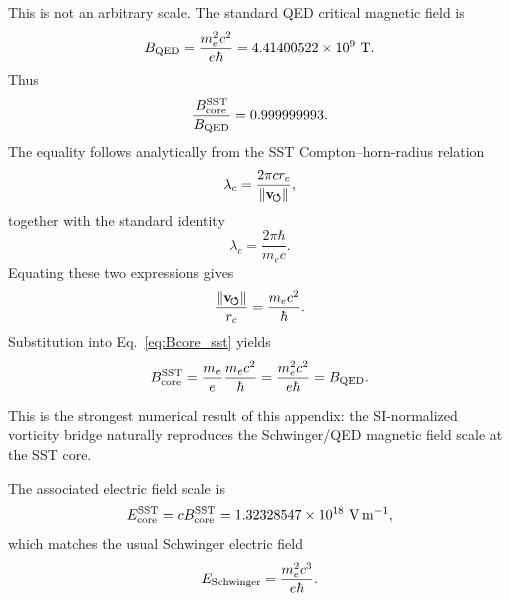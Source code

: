    This is not an arbitrary scale.  The standard QED critical magnetic field
    is
    \begin{equation}
        B_{\rm QED}
        =
        \frac{m_e^2c^2}{e\hbar}
        =
        4.41400522\times10^{9}\ {\rm T}.
        \label{eq:Bqed}
    \end{equation}
    Thus
    \begin{equation}
        \frac{B_{\rm core}^{\rm SST}}{B_{\rm QED}}
        =
        0.999999993.
        \label{eq:Bcore_Bqed_ratio}
    \end{equation}
    The equality follows analytically from the SST Compton--horn-radius relation
    \begin{equation}
        \lambda_c
        =
        \frac{2\pi cr_c}{\lVert\mathbf{v}_{\!\boldsymbol{\circlearrowleft}}\rVert},
        \label{eq:compton_core_relation}
    \end{equation}
    together with the standard identity
    \begin{equation}
        \lambda_c
        =
        \frac{2\pi\hbar}{m_ec}.
    \end{equation}
    Equating these two expressions gives
    \begin{equation}
        \frac{\lVert\mathbf{v}_{\!\boldsymbol{\circlearrowleft}}\rVert}{r_c}
        =
        \frac{m_ec^2}{\hbar}.
        \label{eq:omega_core_compton}
    \end{equation}
    Substitution into Eq.~\eqref{eq:Bcore_sst} yields
    \begin{equation}
        B_{\rm core}^{\rm SST}
        =
        \frac{m_e}{e}
        \frac{m_ec^2}{\hbar}
        =
        \frac{m_e^2c^2}{e\hbar}
        =
        B_{\rm QED}.
        \label{eq:Bcore_equals_Bqed}
    \end{equation}
    
    This is the strongest numerical result of this appendix: the SI-normalized
    vorticity bridge naturally reproduces the Schwinger/QED magnetic field
    scale at the SST core.
    
    The associated electric field scale is
    \begin{equation}
        E_{\rm core}^{\rm SST}
        =
        cB_{\rm core}^{\rm SST}
        =
        1.32328547\times10^{18}\ {\rm V\,m^{-1}},
        \label{eq:Ecore_numeric}
    \end{equation}
    which matches the usual Schwinger electric field
    \begin{equation}
        E_{\rm Schwinger}
        =
        \frac{m_e^2c^3}{e\hbar}.
        \label{eq:Schwinger_field}
    \end{equation}

